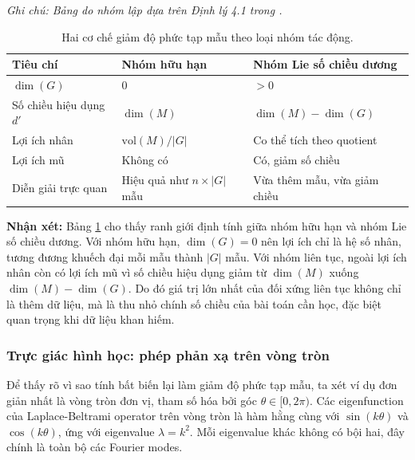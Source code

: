  
\begin{table}[H]
    \centering
    \caption[Hai cơ chế giảm độ phức tạp mẫu theo loại nhóm tác động]{Hai cơ chế giảm độ phức tạp mẫu theo loại nhóm tác động.}
    \label{tab:two-gains}
    \vspace{2pt}
    \textit{Ghi chú: Bảng do nhóm lập dựa trên Định lý 4.1 trong \cite{tahmasebi2023exact}.}
    \vspace{4pt}
    \begin{tabular}{lll}
        \hline
        \rowcolor{gray!20}
        Tiêu chí & Nhóm hữu hạn & Nhóm Lie số chiều dương \\
        \hline
        $\dim(G)$ & $0$ & $> 0$ \\
        Số chiều hiệu dụng $d'$ & $\dim(M)$ & $\dim(M) - \dim(G)$ \\
        Lợi ích nhân & $\mathrm{vol}(M)/|G|$ & Co thể tích theo quotient \\
        Lợi ích mũ & Không có & Có, giảm số chiều \\
        Diễn giải trực quan & Hiệu quả như $n \times |G|$ mẫu & Vừa thêm mẫu, vừa giảm chiều \\
        \hline
    \end{tabular}
\end{table}
 
\textbf{Nhận xét:} Bảng \ref{tab:two-gains} cho thấy ranh giới định tính giữa nhóm hữu hạn và nhóm Lie số chiều dương. Với nhóm hữu hạn, $\dim(G)=0$ nên lợi ích chỉ là hệ số nhân, tương đương khuếch đại mỗi mẫu thành $|G|$ mẫu. Với nhóm liên tục, ngoài lợi ích nhân còn có lợi ích mũ vì số chiều hiệu dụng giảm từ $\dim(M)$ xuống $\dim(M)-\dim(G)$. Do đó giá trị lớn nhất của đối xứng liên tục không chỉ là thêm dữ liệu, mà là thu nhỏ chính số chiều của bài toán cần học, đặc biệt quan trọng khi dữ liệu khan hiếm.
 
\subsubsection{Trực giác hình học: phép phản xạ trên vòng tròn}
 
Để thấy rõ vì sao tính bất biến lại làm giảm độ phức tạp mẫu, ta xét ví dụ đơn giản nhất là vòng tròn đơn vị, tham số hóa bởi góc $\theta \in [0, 2\pi)$. Các eigenfunction của Laplace-Beltrami operator trên vòng tròn là hàm hằng cùng với $\sin(k\theta)$ và $\cos(k\theta)$, ứng với eigenvalue $\lambda = k^2$. Mỗi eigenvalue khác không có bội hai, đây chính là toàn bộ các Fourier modes.
 
